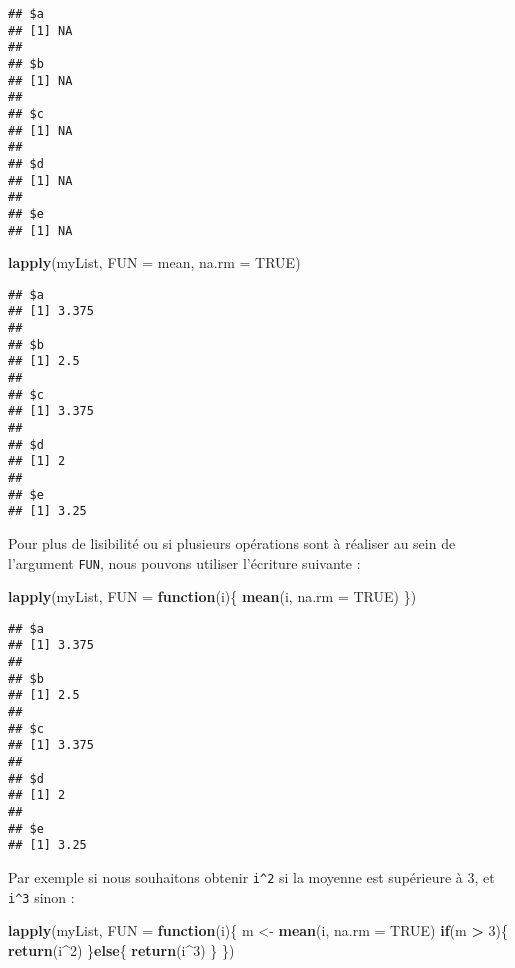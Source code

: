 \documentclass[]{book}
\newenvironment{Shaded}{\begin{snugshade}}{\end{snugshade}}
\newcommand{\KeywordTok}[1]{\textcolor[rgb]{0.13,0.29,0.53}{\textbf{#1}}}
\newcommand{\DataTypeTok}[1]{\textcolor[rgb]{0.13,0.29,0.53}{#1}}
\newcommand{\DecValTok}[1]{\textcolor[rgb]{0.00,0.00,0.81}{#1}}
\newcommand{\StringTok}[1]{\textcolor[rgb]{0.31,0.60,0.02}{#1}}
\newcommand{\OtherTok}[1]{\textcolor[rgb]{0.56,0.35,0.01}{#1}}
\newcommand{\ControlFlowTok}[1]{\textcolor[rgb]{0.13,0.29,0.53}{\textbf{#1}}}
\newcommand{\OperatorTok}[1]{\textcolor[rgb]{0.81,0.36,0.00}{\textbf{#1}}}
\newcommand{\NormalTok}[1]{#1}
\theoremstyle{definition}
\theoremstyle{definition}
\theoremstyle{definition}
\theoremstyle{remark}
\begin{document}
\begin{verbatim}
## $a
## [1] NA
## 
## $b
## [1] NA
## 
## $c
## [1] NA
## 
## $d
## [1] NA
## 
## $e
## [1] NA
\end{verbatim}

\begin{Shaded}
\begin{Highlighting}[]
\KeywordTok{lapply}\NormalTok{(myList, }\DataTypeTok{FUN =}\NormalTok{ mean, }\DataTypeTok{na.rm =} \OtherTok{TRUE}\NormalTok{)}
\end{Highlighting}
\end{Shaded}

\begin{verbatim}
## $a
## [1] 3.375
## 
## $b
## [1] 2.5
## 
## $c
## [1] 3.375
## 
## $d
## [1] 2
## 
## $e
## [1] 3.25
\end{verbatim}

Pour plus de lisibilité ou si plusieurs opérations sont à réaliser au
sein de l'argument \texttt{FUN}, nous pouvons utiliser l'écriture
suivante :

\begin{Shaded}
\begin{Highlighting}[]
\KeywordTok{lapply}\NormalTok{(myList, }\DataTypeTok{FUN =} \ControlFlowTok{function}\NormalTok{(i)\{}
  \KeywordTok{mean}\NormalTok{(i, }\DataTypeTok{na.rm =} \OtherTok{TRUE}\NormalTok{)}
\NormalTok{\})}
\end{Highlighting}
\end{Shaded}

\begin{verbatim}
## $a
## [1] 3.375
## 
## $b
## [1] 2.5
## 
## $c
## [1] 3.375
## 
## $d
## [1] 2
## 
## $e
## [1] 3.25
\end{verbatim}

Par exemple si nous souhaitons obtenir \texttt{i\^{}2} si la moyenne est
supérieure à 3, et \texttt{i\^{}3} sinon :

\begin{Shaded}
\begin{Highlighting}[]
\KeywordTok{lapply}\NormalTok{(myList, }\DataTypeTok{FUN =} \ControlFlowTok{function}\NormalTok{(i)\{}
\NormalTok{  m <-}\StringTok{ }\KeywordTok{mean}\NormalTok{(i, }\DataTypeTok{na.rm =} \OtherTok{TRUE}\NormalTok{)}
  \ControlFlowTok{if}\NormalTok{(m }\OperatorTok{>}\StringTok{ }\DecValTok{3}\NormalTok{)\{}
    \KeywordTok{return}\NormalTok{(i}\OperatorTok{^}\DecValTok{2}\NormalTok{)  }
\NormalTok{  \}}\ControlFlowTok{else}\NormalTok{\{}
    \KeywordTok{return}\NormalTok{(i}\OperatorTok{^}\DecValTok{3}\NormalTok{)}
\NormalTok{  \}}
\NormalTok{\})}
\end{Highlighting}
\end{Shaded}
\end{document}
